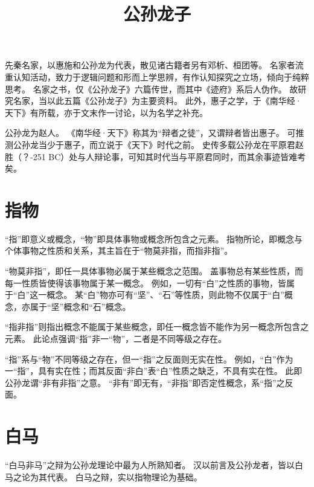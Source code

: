 \documentclass[11pt]{article}
\title{公孙龙子}
\date{}
\begin{document}
  \maketitle
  
  \linenumbers

先秦名家，以惠施和公孙龙为代表，散见诸古籍者另有邓析、桓团等。
名家者流重认知活动，致力于逻辑问题和形而上学思辨，有作认知探究之立场，倾向于纯粹思考。
名家之书，仅《公孙龙子》六篇传世，而其中《迹府》系后人伪作。
故研究名家，当以此五篇《公孙龙子》为主要资料。
此外，惠子之学，于《南华经·天下》有所载，亦于文末作一讨论，以为名学之补充。

\par

公孙龙为赵人。
《南华经·天下》称其为“辩者之徒”，又谓辩者皆出惠子。
可推测公孙龙当少于惠子，而立说于《天下》时代之前。
史传多载公孙龙在平原君赵胜（？-251 BC）处与人辩论事，可知其时代当与平原君同时，而其余事迹皆难考矣。

\section{指物}
“指”即意义或概念，“物”即具体事物或概念所包含之元素。
指物所论，即概念与个体事物之性质和关系，其主旨在于“物莫非指，而指非指”。

\par

“物莫非指”，即任一具体事物必属于某些概念之范围。
盖事物总有某些性质，而每一性质皆使得该事物属于某一概念。
例如，一切有“白”之性质的事物，皆属于“白”这一概念。
某“白”物亦可有“坚”、“石”等性质，则此物不仅属于“白”概念，亦属于“坚”概念和“石”概念。

\par

“指非指”则指出概念不能属于某些概念，即任一概念皆不能作为另一概念所包含之元素。
此论点强调“指”非一“物”，二者是不同等级之存在。

\par

“指”系与“物”不同等级之存在，但一“指”之反面则无实在性。
例如，“白”作为一“指”，具有实在性；而其反面“非白”表“白”性质之缺乏，不具有实在性。
此即公孙龙谓“非有非指”之意。
“非有”即无有，“非指”即否定性概念，系“指”之反面。

\section{白马}
“白马非马”之辩为公孙龙理论中最为人所熟知者。
汉以前言及公孙龙者，皆以白马之论为其代表。
白马之辩，实以指物理论为基础。
\end{document}
